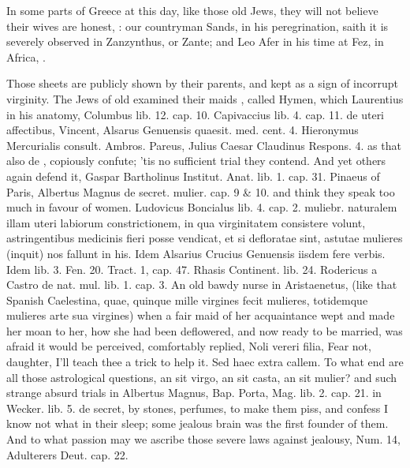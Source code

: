 In some parts of Greece at this day, like those old Jews, they will not believe
their wives are honest, : our
countryman Sands, in his peregrination, saith it is
severely observed in Zanzynthus, or Zante; and Leo Afer in his time at Fez, in
Africa, .

Those sheets are publicly shown by their parents, and kept as a sign of
incorrupt virginity. The Jews of old examined their maids , called Hymen, which Laurentius in his anatomy, Columbus lib.
12. cap. 10. Capivaccius lib. 4. cap. 11. de uteri affectibus, Vincent,
Alsarus Genuensis quaesit. med. cent. 4. Hieronymus Mercurialis
consult. Ambros. Pareus, Julius Caesar Claudinus Respons. 4. as that
also de , copiously confute; 'tis
no sufficient trial they contend. And yet others again defend it,
Gaspar Bartholinus Institut. Anat. lib. 1. cap. 31. Pinaeus of Paris,
Albertus Magnus de secret. mulier. cap. 9 \& 10. \etc{} and think they
speak too much in favour of women.  Ludovicus Boncialus lib. 4.
cap. 2. muliebr. naturalem illam uteri labiorum constrictionem, in qua
virginitatem consistere volunt, astringentibus medicinis fieri posse
vendicat, et si defloratae sint, astutae mulieres (inquit) nos
fallunt in his. Idem Alsarius Crucius Genuensis iisdem fere verbis.
Idem \Avicenna{} lib. 3. Fen. 20. Tract. 1, cap. 47. Rhasis
Continent. lib. 24. Rodericus a Castro de nat. mul. lib. 1. cap. 3. An
old bawdy nurse in Aristaenetus, (like that Spanish Caelestina,
quae, quinque mille virgines fecit mulieres, totidemque mulieres
arte sua virgines) when a fair maid of her acquaintance wept and made
her moan to her, how she had been deflowered, and now ready to be
married, was afraid it would be perceived, comfortably replied, Noli
vereri filia, \etc{} Fear not, daughter, I'll teach thee a trick to help
it. Sed haec extra callem. To what end are all those astrological
questions, an sit virgo, an sit casta, an sit mulier? and such strange
absurd trials in Albertus Magnus, Bap. Porta, Mag. lib. 2. cap. 21. in
Wecker. lib. 5. de secret, by stones, perfumes, to make them piss, and
confess I know not what in their sleep; some jealous brain was the
first founder of them. And to what passion may we ascribe those severe
laws against jealousy, Num.  14, Adulterers Deut. cap. 22.  
